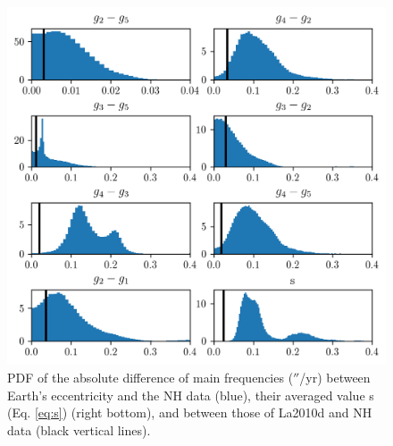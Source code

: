 \documentclass[12pt]{article}
\begin{document}
	\begin{figure}[t]
		\centering
		\includegraphics[scale=1.0]{figures/PDF_ecc_all3}
		\caption{PDF of the absolute difference of main frequencies ($''$/yr) between Earth's eccentricity and the NH data (blue), their averaged value s (Eq. \ref{eq:s}) (right bottom), and between those of La2010d and NH data (black vertical lines). }
		\label{fig:PDF_ecc}
	\end{figure}    
	
\end{document}

